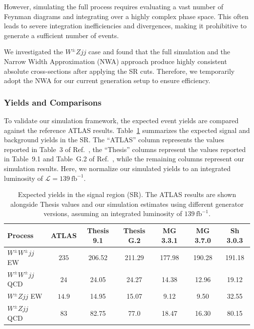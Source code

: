 \documentclass[12pt]{article}
\begin{document}
            However, simulating the full process requires evaluating a vast number of Feynman diagrams and integrating over a highly complex phase space. This often leads to severe integration inefficiencies and divergences, making it prohibitive to generate a sufficient number of events.

            We investigated the $W^{\pm}Zjj$ case and found that the full simulation and the Narrow Width Approximation (NWA) approach produce highly consistent absolute cross-sections after applying the SR cuts. Therefore, we temporarily adopt the NWA for our current generation setup to ensure efficiency.


        \subsubsection{Yields and Comparisons}%
		\label{subs:yields_and_comparisons}

			To validate our simulation framework, the expected event yields are compared against the reference ATLAS results. Table~\ref{tab:background_yields_final_comparison} summarizes the expected signal and background yields in the SR. The ``ATLAS'' column represents the values reported in Table~3 of Ref.~\cite{ATLAS:2023sua}, the ``Thesis'' columns represent the values reported in Table~9.1 and Table~G.2 of Ref.~\cite{stange2025longitudinal}, while the remaining columns represent our simulation results. Here, we normalize our simulated yields to an integrated luminosity of $\mathcal{L} = 139~\mathrm{fb}^{-1}$.

			\begin{table}[htbp]
				\centering
				\caption{Expected yields in the signal region (SR). The ATLAS results are shown alongside Thesis values and our simulation estimates using different generator versions, assuming an integrated luminosity of $139~\mathrm{fb}^{-1}$.}
				\label{tab:background_yields_final_comparison}
				\begin{tabular}{l|ccc|ccc}
					\hline
					\hline
					Process & ATLAS & Thesis 9.1 & Thesis G.2\footnotemark[1] & MG 3.3.1 & MG 3.7.0 & Sh 3.0.3 \\
					\hline
					$W^{\pm}W^{\pm}jj$ EW  & $235$  & 206.52 & 211.29\footnotemark[2] & 177.98 & 190.28 & 191.18 \\
					$W^{\pm}W^{\pm}jj$ QCD & $24$   & 24.05  & 24.27                  & 14.38  & 12.96  & 19.12  \\
					$W^{\pm}Zjj$ EW        & $14.9$ & 14.95  & 15.07                  & 9.12   & 9.50   & 32.55  \\
					$W^{\pm}Zjj$ QCD       & $83$   & 82.75\footnotemark[3] & 77.0    & 18.47  & 16.30  & 80.15  \\
					\hline
					\hline
				\end{tabular}
			\end{table}
\end{document}
